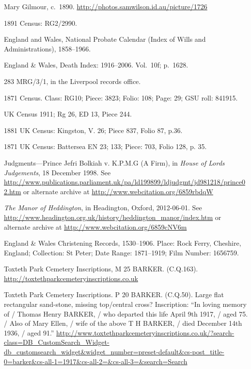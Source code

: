 \begin{thebibliography}{99}

	Mary Gilmour, c.~1890.
	\url{http://photos.samwilson.id.au/picture/1726}

	1891 Census: RG2/2990.

	England and Wales, National Probate Calendar (Index of Wills and Administrations), 1858--1966.

	England \& Wales, Death Index: 1916--2006. Vol.~10f; p.~1628.

	283 MRG/3/1, in the Liverpool records office.

	1871 Census. Class: RG10; Piece: 3823; Folio: 108; Page: 29; GSU roll: 841915.

	UK Census 1911; Rg 26, ED 13, Piece 244.

	1881 UK Census: Kingston, V. 26; Piece 837, Folio 87, p.36.

	1871 UK Census: Battersea EN 23; 133; Piece: 703, Folio 128, p. 35.

	Judgments---Prince Jefri Bolkiah v. K.P.M.G (A Firm), in \emph{House of Lords Judgements}, 18 December 1998.
	See \url{http://www.publications.parliament.uk/pa/ld199899/ldjudgmt/jd981218/prince02.htm}
	or alternate archive at \url{http://www.webcitation.org/6859rbdqW}

	\emph{The Manor of Heddington}, in Headington, Oxford, 2012-06-01.
	See \url{http://www.headington.org.uk/history/heddington_manor/index.htm} or alternate archive at \url{http://www.webcitation.org/6859cNV6m}

	England \& Wales Christening Records, 1530--1906.
	Place: Rock Ferry, Cheshire, England; Collection: St Peter; Date Range: 1871--1919; Film Number: 1656759.

	Toxteth Park Cemetery Inscriptions, M 25 BARKER. (C.Q.163). \url{http://toxtethparkcemeteryinscriptions.co.uk}

	Toxteth Park Cemetery Inscriptions. P 20 BARKER. (C.Q.50).
	Large flat rectangular sand-stone, missing top/central cross? Inscription:
	``In loving memory of / Thomas Henry BARKER, / who departed this life April 9th 1917, / aged 75. /
	Also of Mary Ellen, / wife of the above T H BARKER, / died December 14th 1936, / aged 91.''
	\url{http://www.toxtethparkcemeteryinscriptions.co.uk/?search-class=DB_CustomSearch_Widget-db_customsearch_widget&widget_number=preset-default&cs-post_title-0=barker&cs-all-1=1917&cs-all-2=&cs-all-3=&search=Search}


\end{thebibliography}
